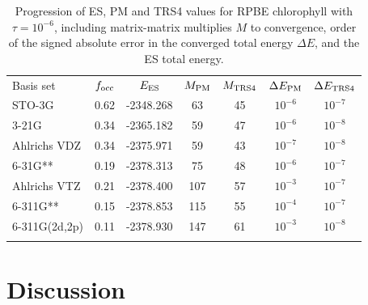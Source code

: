 \commentoutA{\documentclass[prb,aps,twocolumn,twocolumngrid,secnumarabic]{revtex4}}
\begin{document}
\begin{table}[h]
\caption{Progression of ES, PM and TRS4 values for RPBE chlorophyll with $\tau = 10^{-6}$, including 
matrix-matrix multiplies $M$ to convergence, order of the signed absolute error in the converged total 
energy $\Delta E$, and the ES total energy.}
\label{ChlorophyllConvergence}
\squeezetable
\begin{tabular}{lcccccc}
\toprule
Basis set       &  $f_{\rm occ}$ & $E_{\rm ES}$       &$M_{\rm PM}$&$M_{\rm TRS4}$& $\Delta E_{\rm PM}$ & $\Delta E_{\rm TRS4}$ \\
\colrule
STO-3G          &  0.62      & -2348.268  & 63      & 45       & $ 10^{-6}$   &  $ 10^{-7}$   \\ 
3-21G           &  0.34	     & -2365.182  & 59      & 47       & $ 10^{-6}$   &  $ 10^{-8}$   \\
Ahlrichs VDZ    &  0.34      & -2375.971  & 59      & 43       & $ 10^{-7}$   &  $ 10^{-8}$   \\
6-31G**         &  0.19      & -2378.313  & 75      & 48       & $ 10^{-6}$   &  $ 10^{-7}$   \\
Ahlrichs VTZ    &  0.21      & -2378.400  & 107     & 57       & $ 10^{-3}$   &  $ 10^{-7}$   \\
6-311G**        &  0.15      & -2378.853  & 115     & 55       & $ 10^{-4}$   &  $ 10^{-7}$   \\
6-311G(2d,2p)   &  0.11      & -2378.930  & 147     & 61       & $ 10^{-3}$   &  $ 10^{-8}$   \\
\botrule
\end{tabular}
\end{table}

\section{Discussion}
\end{document}
